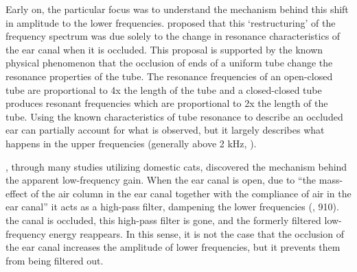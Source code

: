\DIFaddend Early on, the particular focus was to understand the mechanism behind this shift in amplitude to the lower frequencies. \cite{huizing:60} proposed that this `restructuring' of the frequency spectrum was due solely to the change in resonance characteristics of the ear canal when it is occluded.  This proposal is supported by the known physical phenomenon that the occlusion \DIFdelbegin {}\DIFdelend of ends of a uniform tube change the resonance properties of the tube. The resonance frequencies of an open-closed tube are proportional to 4x the length of the tube and a closed-closed tube produces resonant frequencies which are proportional to 2x the length of the tube.  Using the known characteristics of tube resonance to describe an occluded ear can partially account for what is observed, but it largely describes what happens in the upper frequencies (generally above 2 kHz, \cite{stenfelt:03}).  

\cite{tonndorf:66}, through many studies utilizing domestic cats,  discovered the mechanism behind the apparent low-frequency gain.  When the ear canal is open, due to ``the mass-effect of the air column in the ear canal together with the compliance of air in the ear canal'' it acts as a high-pass filter, dampening the lower frequencies (\cite{stenfelt:03}, 910).  \DIFdelbegin {}\DIFdelend \DIFaddbegin {}\DIFaddend the canal is occluded, this high-pass filter is gone, and the formerly filtered low-frequency energy reappears.  In this sense, it is not the case that the occlusion of the ear canal increases the amplitude of lower frequencies, but it prevents them from being filtered out.


\DIFdelbegin {}%

